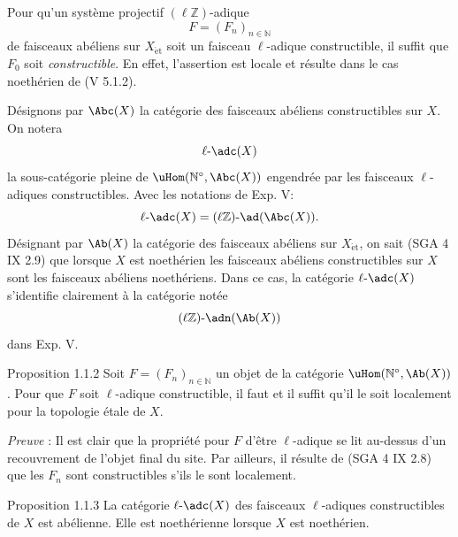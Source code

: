 Pour qu'un système projectif \((\ell\mathbb{Z})\)-adique
\[
F=(F_n)_{n\in\mathbb{N}}
\]
de faisceaux abéliens sur \(X_{\mathrm{\acute et}}\) soit un faisceau \(\ell\)-adique constructible, il suffit que \(F_0\) soit \emph{constructible}. En effet, l'assertion est locale et résulte dans le cas noethérien de (V 5.1.2).

Désignons par \(\Abc(X)\) la catégorie des faisceaux abéliens constructibles sur \(X\). On notera
\[
\ell\text{-}\adc(X)
\]
la sous-catégorie pleine de \(\uHom(\mathbb{N}^{\circ},\Abc(X))\) engendrée par les faisceaux
\(\ell\)-adiques constructibles. Avec les notations de Exp. V:
\[
\ell\text{-}\adc(X)=(\ell\mathbb{Z})\text{-}\ad(\Abc(X)).
\]
Désignant par \(\Ab(X)\) la catégorie des faisceaux abéliens sur \(X_{\mathrm{\acute et}}\), on sait (SGA 4 IX 2.9) que lorsque \(X\) est noethérien les faisceaux abéliens constructibles sur \(X\) sont les faisceaux abéliens noethériens. Dans ce cas, la catégorie \(\ell\text{-}\adc(X)\) s'identifie clairement à la catégorie notée
\[
(\ell\mathbb{Z})\text{-}\adn(\Ab(X))
\]
dans Exp. V.

\begin{statement}{Proposition 1.1.2}
Soit \(F=(F_n)_{n\in\mathbb{N}}\) un objet de la catégorie \(\uHom(\mathbb{N}^\circ,\Ab(X))\). Pour que \(F\) soit \(\ell\)-adique constructible, il faut et il suffit qu'il le soit localement pour la topologie étale de \(X\).
\end{statement}

\emph{Preuve} : Il est clair que la propriété pour \(F\) d'être \(\ell\)-adique se lit au-dessus d'un recouvrement de l'objet final du site. Par ailleurs, il résulte de (SGA 4 IX 2.8) que les \(F_n\) sont constructibles s'ils le sont localement.

\begin{statement}{Proposition 1.1.3}
La catégorie \(\ell\text{-}\adc(X)\) des faisceaux \(\ell\)-adiques constructibles de \(X\) est abélienne. Elle est noethérienne lorsque \(X\) est noethérien.
\end{statement}

